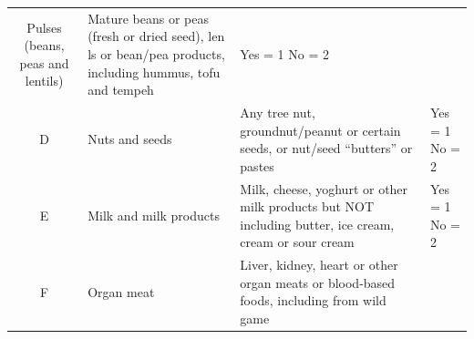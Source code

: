 \documentclass[12pt,]{book}
\theoremstyle{definition}
\theoremstyle{definition}
\theoremstyle{definition}
\theoremstyle{remark}
\begin{document}
\begin{longtable}[]{@{}clll@{}}
\begin{minipage}[t]{0.18\columnwidth}
Pulses (beans, peas and lentils)\strut
\end{minipage} & \begin{minipage}[t]{0.54\columnwidth}\raggedright
Mature beans or peas (fresh or dried seed), len ls or bean/pea products,
including hummus, tofu and tempeh\strut
\end{minipage} & \begin{minipage}[t]{0.12\columnwidth}\raggedright
Yes = 1 No = 2\strut
\end{minipage}\tabularnewline
\begin{minipage}[t]{0.05\columnwidth}\centering
D\strut
\end{minipage} & \begin{minipage}[t]{0.18\columnwidth}\raggedright
Nuts and seeds\strut
\end{minipage} & \begin{minipage}[t]{0.54\columnwidth}\raggedright
Any tree nut, groundnut/peanut or certain seeds, or nut/seed ``butters''
or pastes\strut
\end{minipage} & \begin{minipage}[t]{0.12\columnwidth}\raggedright
Yes = 1 No = 2\strut
\end{minipage}\tabularnewline
\begin{minipage}[t]{0.05\columnwidth}\centering
E\strut
\end{minipage} & \begin{minipage}[t]{0.18\columnwidth}\raggedright
Milk and milk products\strut
\end{minipage} & \begin{minipage}[t]{0.54\columnwidth}\raggedright
Milk, cheese, yoghurt or other milk products but NOT including butter,
ice cream, cream or sour cream\strut
\end{minipage} & \begin{minipage}[t]{0.12\columnwidth}\raggedright
Yes = 1 No = 2\strut
\end{minipage}\tabularnewline
\begin{minipage}[t]{0.05\columnwidth}\centering
F\strut
\end{minipage} & \begin{minipage}[t]{0.18\columnwidth}\raggedright
Organ meat\strut
\end{minipage} & \begin{minipage}[t]{0.54\columnwidth}\raggedright
Liver, kidney, heart or other organ meats or blood-based foods,
including from wild game\strut
\end{minipage} & \begin{minipage}[t]{0.12\columnwidth}\raggedright

\end{minipage}
\end{longtable}
\end{document}
